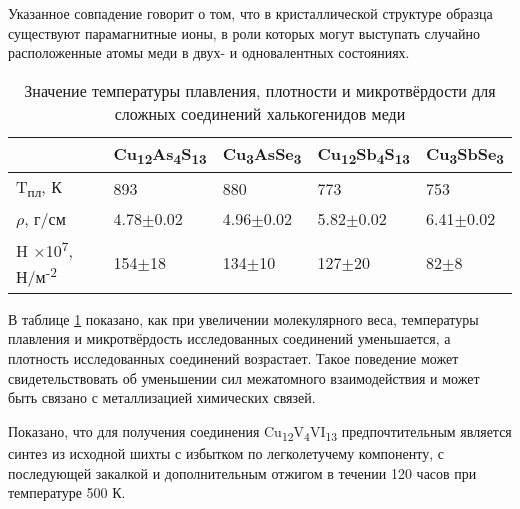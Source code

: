 Указанное совпадение говорит о том, что в кристаллической структуре образца существуют парамагнитные ионы, в роли которых могут выступать случайно расположенные атомы меди в двух- и одновалентных состояниях.

\begin{table} [htbp]%
    \centering
	\caption{Значение температуры плавления, плотности и микротвёрдости для сложных соединений халькогенидов меди}%
	\label{hard}%
    \renewcommand{\arraystretch}{1.5}
	\begin{tabular}{@{}@{\extracolsep{20pt}}lllll@{}}
        \toprule     %
    	 & Cu\textsubscript{12}As\textsubscript{4}S\textsubscript{13} &Cu\textsubscript{3}AsSe\textsubscript{3}& Cu\textsubscript{12}Sb\textsubscript{4}S\textsubscript{13} &Cu\textsubscript{3}SbSe\textsubscript{3}	\\
        \midrule
    T\textsubscript{пл}, К & 893 & 880												& 773& 753	\\ \hline
    	$ \rho$, г/см 	&  4.78$\pm$0.02	 						& 4.96$\pm$0.02												&5.82$\pm$0.02 	& 6.41$\pm$0.02 \\ \hline
    	H $\times$10\textsuperscript{7}, Н/м\textsuperscript{-2} 	& 154$\pm$18	 						& 134$\pm$10 	& 127$\pm$20			& 82$\pm$8	\\ \hline

        \bottomrule
	\end{tabular}%
\end{table}
В таблице \ref{hard} показано, как при увеличении молекулярного веса, температуры плавления и микротвёрдость исследованных соединений уменьшается, а плотность исследованных соединений возрастает. Такое поведение может свидетельствовать об уменьшении сил межатомного взаимодействия и может быть связано с металлизацией химических
связей.

Показано, что для получения соединения Cu\textsubscript{12}V\textsubscript{4}VI\textsubscript{13} предпочтительным является синтез из
исходной шихты с избытком по легколетучему компоненту, с последующей закалкой и
дополнительным отжигом в течении 120 часов при температуре 500 К.
\clearpage

\newpage
